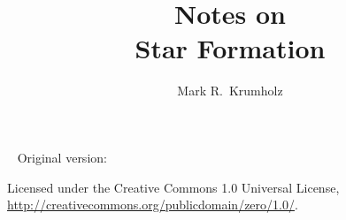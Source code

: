 \documentclass{tufte-book} %
\title{Notes on\\Star Formation} %
\author{Mark R.~Krumholz} %
\newcommand{\monthyear}{\ifcase\month\or January\or February\or March\or April\or May\or June\or July\or August\or September\or October\or November\or December\fi\space\number\year} %
\newcommand{\openepigraph}[2]{ %
\begin{fullwidth}
\sffamily\large
\begin{doublespace}
\noindent\allcaps{#1}\\ %
\noindent\allcaps{#2} %
\end{doublespace}
\end{fullwidth}
}
\begin{document}
\frontmatter


\thispagestyle{empty}


\maketitle %


\newpage
\begin{fullwidth}
~\vfill
\thispagestyle{empty}
\setlength{\parindent}{0pt}
\setlength{\parskip}{\baselineskip}
Original version: \the\year\ \thanklessauthor

\par{}

\par{}

\par Licensed under the Creative Commons 1.0 Universal License, \url{http://creativecommons.org/publicdomain/zero/1.0/}.

\end{fullwidth}


\tableofcontents %


\listoffigures %

\end{document}
